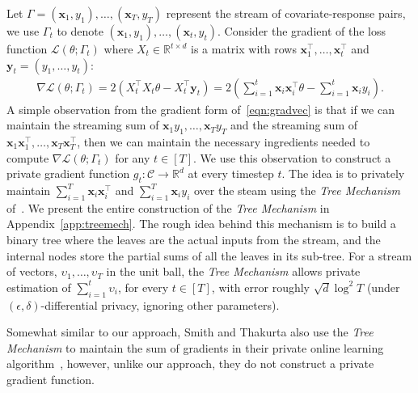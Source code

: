 \documentclass{article}
\theoremstyle{plain}
\def \y {\mathbf y}
\def \eps {\epsilon}
\def \CCC {\mathcal{C}}
\def \LLL {\mathcal{L}}
\def \x {\mathbf x}
\def \R {\mathbb{R}}
\begin{document}
Let $\Gamma = (\x_1,y_1),\dots,(\x_T,y_T)$ represent the stream of covariate-response pairs, we use $\Gamma_t$ to denote $(\x_1,y_1),\dots,(\x_t,y_t)$. Consider the gradient of the loss function $\LLL(\theta; \Gamma_t)$ where $X_t \in \R^{t \times d}$ is a matrix with rows $\x_1^\top,\dots,\x_t^\top$ and $\y_t=(y_1,\dots,y_t)$:
\begin{align} \label{eqn:gradvec}
\nabla \LLL(\theta; \Gamma_t) =  2 (X_t^\top X_t \theta - X_t^\top \y_t) = 2 \left (\sum_{i=1}^t \x_i \x_i^\top \theta  -  \sum_{i=1}^t \x_i y_i\right ).
\end{align}
A simple observation from the gradient form of~\eqref{eqn:gradvec} is that if we can maintain the streaming sum of $\x_1 y_1,\dots,\x_T y_T$ and the streaming sum of $\x_1 \x_1^\top,\dots,\x_T \x_T^\top$, then we can maintain the necessary ingredients needed to compute $\nabla \LLL(\theta; \Gamma_t)$ for any $t \in [T]$. We use this observation to construct a private gradient function $g_t : \CCC \rightarrow \R^d$ at every timestep $t$. The idea is to privately maintain $\sum_{i=1}^T \x_i \x_i^\top$ and $\sum_{i=1}^T \x_i y_i$ over the steam using the \emph{Tree Mechanism} of~\cite{DNPR10,CSS11}. We present the entire construction of the \emph{Tree Mechanism} in Appendix~\ref{app:treemech}. The rough idea behind this mechanism is to build a binary tree where the leaves are the actual inputs from the stream, and the internal nodes store the partial sums of all the leaves in its sub-tree. For a stream of vectors, $\upsilon_1,\dots,\upsilon_T$ in the unit ball, the \emph{Tree Mechanism} allows private estimation of $\sum_{i=1}^t \upsilon_i$, for every $t \in [T]$, with error roughly $\sqrt{d} \log^{2} T$ (under $(\eps,\delta)$-differential privacy, ignoring other parameters). 

Somewhat similar to our approach, Smith and Thakurta also use the \emph{Tree Mechanism} to maintain the sum of gradients in their private online learning algorithm~\cite{thakurta2013nearly}, however, unlike our approach, they do not construct a private gradient function.
\end{document}
